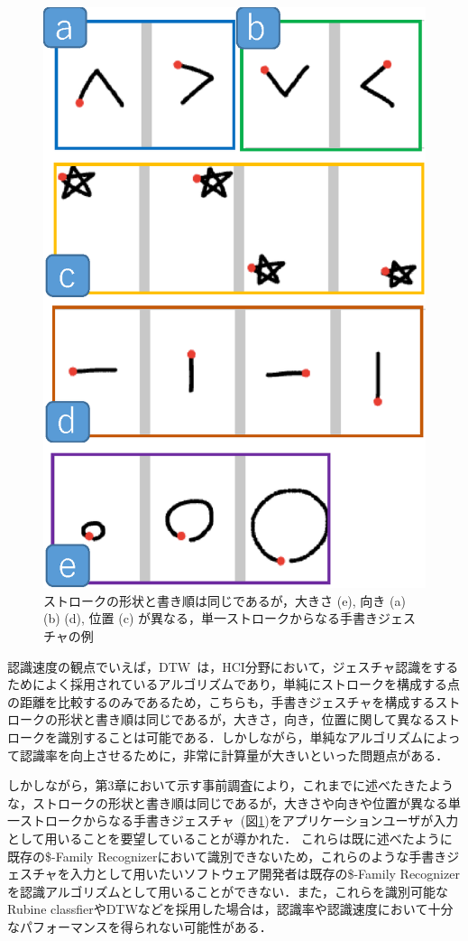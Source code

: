 \begin{figure} [htbp]
\centering
\includegraphics [width=0.5\columnwidth]{img/examples_V.eps}
\caption{ストロークの形状と書き順は同じであるが，大きさ (e), 向き (a) (b) (d), 位置 (c) が異なる，単一ストロークからなる手書きジェスチャの例}
\label{fig:examples_V}
\end{figure}


認識速度の観点でいえば，DTW~\cite{Tappert:1982:CSR:1664966.1664979, Salvador:2007:TAD:1367985.1367993}は，HCI分野において，ジェスチャ認識をするためによく採用されているアルゴリズムであり，単純にストロークを構成する点の距離を比較するのみであるため，こちらも，手書きジェスチャを構成するストロークの形状と書き順は同じであるが，大きさ，向き，位置に関して異なるストロークを識別することは可能である．しかしながら，単純なアルゴリズムによって認識率を向上させるために，非常に計算量が大きいといった問題点がある．

しかしながら，第3章において示す事前調査により，これまでに述べたきたような，ストロークの形状と書き順は同じであるが，大きさや向きや位置が異なる単一ストロークからなる手書きジェスチャ~(図\ref{fig:examples_V})をアプリケーションユーザが入力として用いることを要望していることが導かれた．
これらは既に述べたように既存の\$-Family Recognizerにおいて識別できないため，これらのような手書きジェスチャを入力として用いたいソフトウェア開発者は既存の\$-Family Recognizerを認識アルゴリズムとして用いることができない．また，これらを識別可能なRubine classfierやDTWなどを採用した場合は，認識率や認識速度において十分なパフォーマンスを得られない可能性がある．


